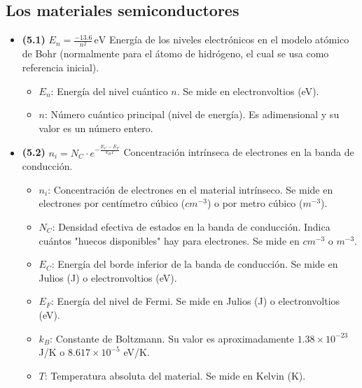 \documentclass{article}
\begin{document}
		\subsection*{Los materiales semiconductores}
			\begin{itemize}
				\item \textbf{(5.1)} $\boxed{E_{n}=\frac{-13.6}{n^{2}}\,\text{eV}}$ Energía de los niveles electrónicos en el modelo atómico de Bohr (normalmente para el átomo de hidrógeno, el cual se usa como referencia inicial).
					\begin{itemize}
						\item $E_{n}$: Energía del nivel cuántico $n$. Se mide en electronvoltios (eV).
						\item $n$: Número cuántico principal (nivel de energía). Es adimensional y su valor es un número entero.
					\end{itemize}

				\item \textbf{(5.2)} $\boxed{n_i = N_C \cdot e^{-\frac{E_C - E_F}{k_B T}}}$ Concentración intrínseca de electrones en la banda de conducción.
					\begin{itemize}
						\item $n_i$: Concentración de electrones en el material intrínseco. Se mide en electrones por centímetro cúbico ($cm^{-3}$) o por metro cúbico ($m^{-3}$).
						\item $N_C$: Densidad efectiva de estados en la banda de conducción. Indica cuántos "huecos disponibles" hay para electrones. Se mide en $cm^{-3}$ o $m^{-3}$.
						\item $E_C$: Energía del borde inferior de la banda de conducción. Se mide en Julios (J) o electronvoltios (eV).
						\item $E_F$: Energía del nivel de Fermi. Se mide en Julios (J) o electronvoltios (eV).
						\item $k_B$: Constante de Boltzmann. Su valor es aproximadamente $1.38 \times 10^{-23}$ J/K o $8.617 \times 10^{-5}$ eV/K.
						\item $T$: Temperatura absoluta del material. Se mide en Kelvin (K).
					\end{itemize}


\end{itemize}
\end{document}

